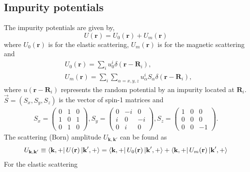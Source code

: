 \documentclass[aps,prb,amsmath,amssymb,footinbib,showpacs,twocolumn]{revtex4-2}
\begin{document}
\begin{widetext}
\subsection{Impurity potentials}
The impurity potentials are given by,
\begin{equation}
    U(\textbf{r})=U_{0}(\textbf{r})+U_{m}(\textbf{r})
\end{equation}
where $U_{0}(\textbf{r})$ is for the elastic scattering, $U_{m}(\textbf{r})$ is for the magnetic scattering and
\begin{align}
 &U_{0}(\textbf{r})=\sum_{i}u^{i}_{0}\delta(\textbf{r}-\textbf{R}_{i}), \nonumber\\
 &U_{m}(\textbf{r})=\sum_{i}\sum_{\alpha=x,y,z}u^{i}_{\alpha}S_{\alpha}\delta(\textbf{r}-\textbf{R}_{i}),
\end{align}
where $u(\textbf{r}-\textbf{R}_{i})$ represents the random potential by an impurity located at $\textbf{R}_{i}$. $\Vec{S}=(S_{x},S_{y},S_{z})$ is the vector of spin-1 matrices and 
\begin{align}
   S_{x} = \begin{pmatrix}
0 & 1 & 0\\
1 & 0 & 1\\
0 & 1 & 0
\end{pmatrix}, S_{y} = \begin{pmatrix}
0 & -i & 0\\
i & 0 & -i\\
0 & i & 0
\end{pmatrix}, S_{z} = \begin{pmatrix}
1 & 0 & 0\\
0 & 0 & 0\\
0 & 0 & -1
\end{pmatrix}.
\end{align}
The scattering (Born) amplitude $U_{\textbf{k},\textbf{k}'}$ can be found as
\begin{equation}
      U_{\textbf{k},\textbf{k}'} \equiv \bra{\textbf{k},+} U(\textbf{r})\ket{\textbf{k}',+}
= \bra{\textbf{k},+} U_{0}(\textbf{r})\ket{\textbf{k}',+}+\bra{\textbf{k},+} U_{m}(\textbf{r})\ket{\textbf{k}',+}
\end{equation}
For the elastic scattering


\end{widetext}
\end{document}
